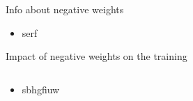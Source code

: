 \begin{frame}{Info about negative weights}
    \begin{itemize}
        \item serf
    \end{itemize}
\end{frame}

\begin{frame}{Impact of negative weights on the training}
    \begin{columns}
        \begin{column}{0.5\textwidth}
            \centering
        \end{column}
        \begin{column}{0.5\textwidth}
            \centering
        \end{column}
    \end{columns}
    \begin{itemize}
        \item sbhgfiuw
    \end{itemize}
\end{frame}